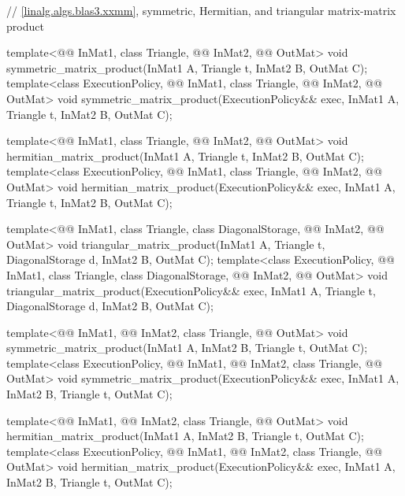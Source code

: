 \begin{codeblock}
{  // \ref{linalg.algs.blas3.xxmm}, symmetric, Hermitian, and triangular matrix-matrix product

  template<@@ InMat1, class Triangle, @@ InMat2, @@ OutMat>
    void symmetric_matrix_product(InMat1 A, Triangle t, InMat2 B, OutMat C);
  template<class ExecutionPolicy,
           @@ InMat1, class Triangle, @@ InMat2, @@ OutMat>
    void symmetric_matrix_product(ExecutionPolicy&& exec,
                                  InMat1 A, Triangle t, InMat2 B, OutMat C);

  template<@@ InMat1, class Triangle, @@ InMat2, @@ OutMat>
    void hermitian_matrix_product(InMat1 A, Triangle t, InMat2 B, OutMat C);
  template<class ExecutionPolicy,
           @@ InMat1, class Triangle, @@ InMat2, @@ OutMat>
    void hermitian_matrix_product(ExecutionPolicy&& exec,
                                  InMat1 A, Triangle t, InMat2 B, OutMat C);

  template<@@ InMat1, class Triangle, class DiagonalStorage,
           @@ InMat2, @@ OutMat>
    void triangular_matrix_product(InMat1 A, Triangle t, DiagonalStorage d, InMat2 B, OutMat C);
  template<class ExecutionPolicy,
           @@ InMat1, class Triangle, class DiagonalStorage,
           @@ InMat2, @@ OutMat>
    void triangular_matrix_product(ExecutionPolicy&& exec,
                                   InMat1 A, Triangle t, DiagonalStorage d, InMat2 B, OutMat C);

  template<@@ InMat1, @@ InMat2, class Triangle, @@ OutMat>
    void symmetric_matrix_product(InMat1 A, InMat2 B, Triangle t, OutMat C);
  template<class ExecutionPolicy,
           @@ InMat1, @@ InMat2, class Triangle, @@ OutMat>
    void symmetric_matrix_product(ExecutionPolicy&& exec,
                                  InMat1 A, InMat2 B, Triangle t, OutMat C);

  template<@@ InMat1, @@ InMat2, class Triangle, @@ OutMat>
    void hermitian_matrix_product(InMat1 A, InMat2 B, Triangle t, OutMat C);
  template<class ExecutionPolicy,
           @@ InMat1, @@ InMat2, class Triangle, @@ OutMat>
    void hermitian_matrix_product(ExecutionPolicy&& exec,
                                  InMat1 A, InMat2 B, Triangle t, OutMat C);

}
\end{codeblock}
